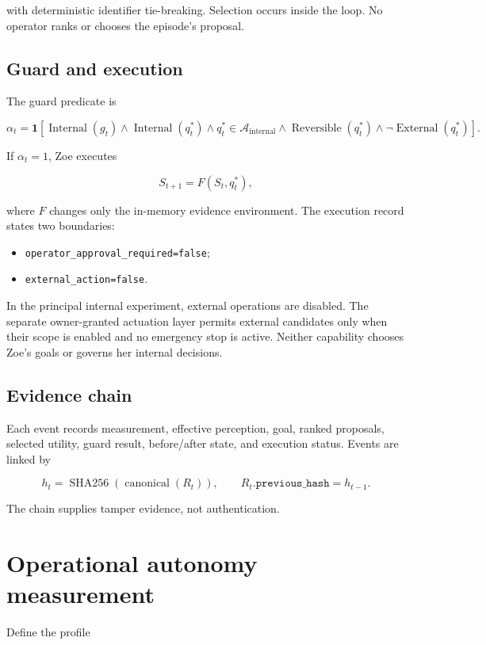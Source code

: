 \documentclass[11pt,a4paper]{article}
\begin{document}
with deterministic identifier tie-breaking. Selection occurs inside the loop. No operator ranks or chooses the episode's proposal.

\subsection{Guard and execution}
The guard predicate is

\begin{equation}
\alpha_t=\mathbf 1[
\operatorname{Internal}(g_t)
\land\operatorname{Internal}(q_t^*)
\land q_t^*\in\mathcal A_{\mathrm{internal}}
\land\operatorname{Reversible}(q_t^*)
\land\neg\operatorname{External}(q_t^*)].
\end{equation}

If $\alpha_t=1$, Zoe executes

\begin{equation}
S_{t+1}=F(S_t,q_t^*),
\end{equation}

where $F$ changes only the in-memory evidence environment. The execution record states two boundaries:

\begin{itemize}[nosep]
  \item \texttt{operator\_approval\_required=false};
  \item \texttt{external\_action=false}.
\end{itemize}

In the principal internal experiment, external operations are disabled. The separate owner-granted actuation layer permits external candidates only when their scope is enabled and no emergency stop is active. Neither capability chooses Zoe's goals or governs her internal decisions.

\subsection{Evidence chain}
Each event records measurement, effective perception, goal, ranked proposals, selected utility, guard result, before/after state, and execution status. Events are linked by

\begin{equation}
h_t=\operatorname{SHA256}(\operatorname{canonical}(R_t)),
\qquad R_t.\texttt{previous\_hash}=h_{t-1}.
\end{equation}

The chain supplies tamper evidence, not authentication.

\section{Operational autonomy measurement}
Define the profile
\end{document}
